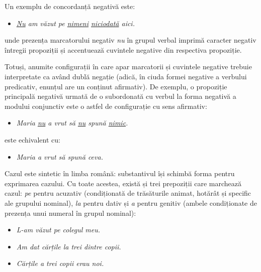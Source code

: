 \begin{multicols}{2}
Un exemplu de concordanță negativă este:

\begin{itemize}
\item\textit{\underline{Nu} am văzut pe \underline{nimeni} \underline{niciodată} aici.}
\end{itemize}

unde prezența marcatorului negativ \textit{nu} în grupul verbal imprimă caracter negativ întregii propoziții și accentuează cuvintele negative din respectiva propoziție. 

Totuși, anumite configurații în care apar marcatorii și cuvintele negative trebuie interpretate ca având dublă negație (adică, în ciuda formei negative a verbului predicativ, enunțul are un conținut afirmativ). De exemplu, o propoziție principală negativă urmată de o subordonată cu verbul la forma negativă a modului conjunctiv este o astfel de configurație cu sens afirmativ:

\begin{itemize}
\item\textit{Maria \underline{nu} a vrut să \underline{nu} spună \underline{nimic}.}
\end{itemize}

este echivalent cu:

\begin{itemize}
\item\textit{Maria a vrut să spună ceva.}
\end{itemize}

Cazul este sintetic în limba română: substantivul își schimbă forma pentru exprimarea cazului. Cu toate acestea, există și trei prepoziții care marchează cazul: \textit{pe} pentru acuzativ (condiționată de trăsăturile animat, hotărât și specific ale grupului nominal), \textit{la} pentru dativ și \textit{a} pentru genitiv (ambele condiționate de prezența unui numeral în grupul nominal):

\begin{itemize}
\item \textit{L-am văzut \textit{pe} colegul meu.}
\item \textit{Am dat cărțile \textit{la} trei dintre copii.}
\item \textit{Cărțile \textit{a} trei copii erau noi.}
\end{itemize}



\end{multicols}
